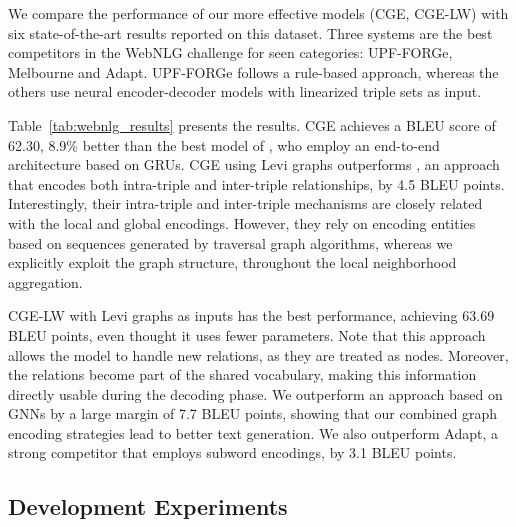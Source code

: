 \documentclass[11pt,a4paper]{article}
\begin{document}
We compare the performance of our more effective models ({\selectfont CGE}, {\selectfont CGE-LW}) with six state-of-the-art results reported on this dataset. Three systems are the best competitors in the WebNLG challenge for seen categories: UPF-FORGe, Melbourne and Adapt. UPF-FORGe follows a rule-based approach, whereas the others use neural encoder-decoder models with linearized triple sets as input. 

Table~\ref{tab:webnlg_results} presents the results. {\selectfont CGE} achieves a BLEU score of 62.30, 8.9\% better than the best model of \citet{castro-ferreira-etal-2019-neural}, who employ an end-to-end architecture based on GRUs. {\selectfont CGE} using Levi graphs outperforms \citet{trisedya-etal-2018-gtr}, an approach that encodes both intra-triple and inter-triple relationships, by 4.5 BLEU points. Interestingly, their intra-triple and inter-triple mechanisms are closely related with the local and global encodings. However, they rely on encoding entities based on sequences generated by traversal graph algorithms, whereas we explicitly exploit the graph structure, throughout the local neighborhood aggregation. 

{\selectfont CGE-LW} with Levi graphs as inputs has the best performance, achieving 63.69 BLEU points, even thought it uses fewer parameters. Note that this approach allows the model to handle new relations, as they are treated as nodes. Moreover, the relations become part of the shared vocabulary, making this information directly usable during the decoding phase. We outperform an approach based on GNNs \cite{marcheggiani-icnl18} by a large margin of 7.7 BLEU points, showing that our combined graph encoding strategies lead to better text generation. We also outperform Adapt, a strong competitor that employs subword encodings, by 3.1 BLEU points.




\subsection{Development Experiments}
\end{document}
